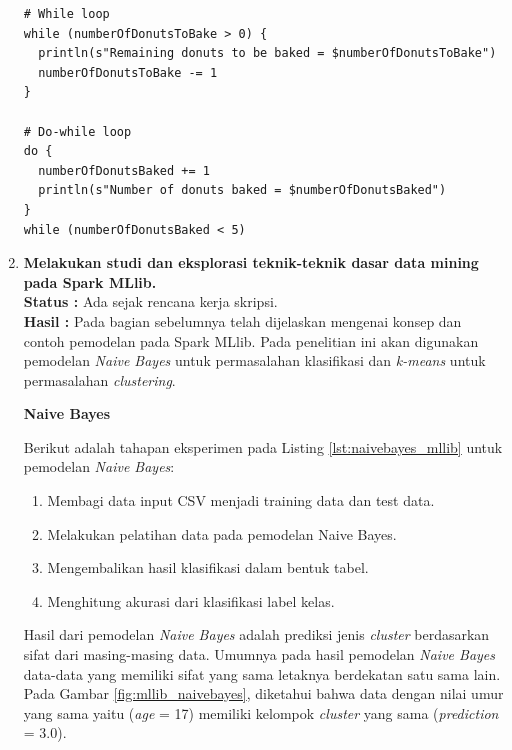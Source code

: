 \documentclass[a4paper,twoside]{article}
\begin{document}
\begin{enumerate}
\begin{lstlisting}[basicstyle=\ttfamily, frame=single,
	columns=fullflexible, keepspaces=true, breaklines=true, label=lst:perulangan, caption=Membuat Fungsi Perulangan pada Scala]
# While loop
while (numberOfDonutsToBake > 0) {
  println(s"Remaining donuts to be baked = $numberOfDonutsToBake")
  numberOfDonutsToBake -= 1
}

# Do-while loop
do {
  numberOfDonutsBaked += 1
  println(s"Number of donuts baked = $numberOfDonutsBaked")
} 
while (numberOfDonutsBaked < 5)

\end{lstlisting}
		
\vspace{0.5cm}		
		\item \textbf{Melakukan studi dan eksplorasi teknik-teknik dasar data mining pada Spark MLlib.}\\
		{\bf Status :} Ada sejak rencana kerja skripsi.\\
		{\bf Hasil :} Pada bagian sebelumnya telah dijelaskan mengenai konsep dan contoh pemodelan pada Spark MLlib. Pada penelitian ini akan digunakan pemodelan \textit{Naive Bayes} untuk permasalahan klasifikasi dan \textit{k-means} untuk permasalahan \textit{clustering}.

\newpage
\textbf{Naive Bayes}

\noindent Berikut adalah tahapan eksperimen pada Listing \ref{lst:naivebayes_mllib} untuk pemodelan \textit{Naive Bayes}:
\begin{enumerate}
\item Membagi data input CSV menjadi training data dan test data.
\item Melakukan pelatihan data pada pemodelan Naive Bayes.
\item Mengembalikan hasil klasifikasi dalam bentuk tabel.
\item Menghitung akurasi dari klasifikasi label kelas.
\end{enumerate}	

\par Hasil dari pemodelan \textit{Naive Bayes} adalah prediksi jenis \textit{cluster} berdasarkan sifat dari masing-masing data. Umumnya pada hasil pemodelan \textit{Naive Bayes} data-data yang memiliki sifat yang sama letaknya berdekatan satu sama lain. Pada Gambar \ref{fig:mllib_naivebayes}, diketahui bahwa data dengan nilai umur yang sama yaitu (\textit{age} = 17) memiliki kelompok \textit{cluster} yang sama (\textit{prediction} = 3.0).


\end{enumerate}
\end{document}
